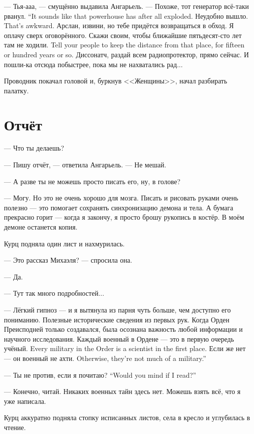 --- Тья-ааа, --- смущённо выдавила Ангарьель.
{--- Похоже, тот генератор всё-таки рванул.}
{``It sounds like that powerhouse has after all exploded.}
{Неудобно вышло.}
{That's awkward.}
Арслан, извини, но тебе придётся возвращаться в обход.
Я оплачу сверх оговорённого.
{Скажи своим, чтобы ближайшие пятьдесят-сто лет там не ходили.}
{Tell your people to keep the distance from that place, for fifteen or hundred years or so.}
Диссонатч, раздай всем радиопротектор, прямо сейчас.
И пошли-ка отсюда побыстрее, пока мы не нахватались рад...

Проводник покачал головой и, буркнув <<Женщины>>, начал разбирать палатку.

\section{Отчёт}

--- Что ты делаешь?

--- Пишу отчёт, --- ответила Ангарьель.
--- Не мешай.

--- А разве ты не можешь просто писать его, ну, в голове?

--- Могу.
Но это не очень хорошо для мозга.
Писать и рисовать руками очень полезно --- это помогает сохранять синхронизацию демона и тела.
А бумага прекрасно горит --- когда я закончу, я просто брошу рукопись в костёр.
В моём демоне останется копия.

Курц подняла один лист и нахмурилась.

--- Это рассказ Михаэля? --- спросила она.

--- Да.

--- Тут так много подробностей...

--- Лёгкий гипноз --- и я вытянула из парня чуть больше, чем доступно его пониманию.
Полезные исторические сведения из первых рук.
Когда Орден Преисподней только создавался, была осознана важность любой информации и научного исследования.
{Каждый военный в Ордене --- это в первую очередь учёный.}
{Every military in the Order is a scientist in the first place.}
{Если же нет --- он военный не ахти.}
{Otherwise, they're not much of a military.''}

{--- Ты не против, если я почитаю?}
{``Would you mind if I read?''}

--- Конечно, читай.
Никаких военных тайн здесь нет.
Можешь взять всё, что я уже написала.

Курц аккуратно подняла стопку исписанных листов, села в кресло и углубилась в чтение.

